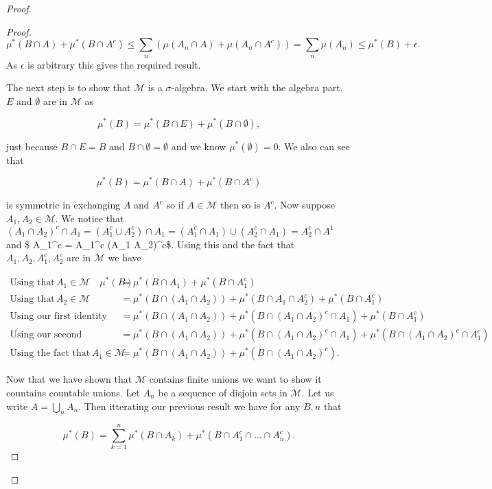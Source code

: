 \documentclass[
]{book}
\theoremstyle{definition}
\theoremstyle{definition}
\theoremstyle{definition}
\theoremstyle{definition}
\theoremstyle{remark}
\begin{document}
\begin{proof}
\begin{proof}
\[ \mu^*(B \cap A) + \mu^*(B \cap A^c) \leq \sum_n \left( \mu(A_n \cap A) + \mu(A_n \cap A^c) \right) = \sum_n \mu(A_n) \leq \mu^*(B) + \epsilon. \]
As \(\epsilon\) is arbitrary this gives the required result.

The next step is to show that \(\mathscr{M}\) is a \(\sigma\)-algebra. We start with the algebra part. \(E\) and \(\emptyset\) are in \(\mathscr{M}\) as

\[ \mu^*(B) = \mu^*(B \cap E) + \mu^*(B \cap \emptyset), \]

just because \(B \cap E = B\) and \(B \cap \emptyset = \emptyset\) and we know \(\mu^*(\emptyset) =0\). We also can see that

\[ \mu^*(B) = \mu^*(B \cap A) + \mu^*(B \cap A^c) \]

is symmetric in exchanging \(A\) and \(A^c\) so if \(A \in \mathscr{M}\) then so is \(A^c\). Now suppose \(A_1, A_2 \in \mathscr{M}\). We notice that \((A_1 \cap A_2)^c \cap A_1 = (A_1^c \cup A_2^c) \cap A_1 = (A_1^c \cap A_1) \cup (A_2^c \cap A_1) = A_2^c \cap A^1\) and \$ A\_1\^{}c = A\_1\^{}c \cap(A\_1 \cap A\_2)\^{}c\$. Using this and the fact that \(A_1, A_2, A_1^c, A_2^c\) are in \(\mathscr{M}\) we have

\begin{align*}\mbox{Using that} \, A_1 \in \mathscr{M} \quad \mu^*(B) &= \mu^*(B \cap A_1) + \mu^*(B \cap A_1^c)\\
\mbox{Using that}\, A_2 \in \mathscr{M} \quad &= \mu^*(B \cap (A_1 \cap A_2)) + \mu^*(B \cap A_1 \cap A_2^c) + \mu^*(B \cap A_1^c)\\
\mbox{Using our first identity} \quad &= \mu^*(B \cap (A_1 \cap A_2)) + \mu^*(B \cap (A_1 \cap A_2)^c \cap A_1) + \mu^*(B \cap A_1^c)\\
\mbox{Using our second identiy} \quad &= \mu^*(B \cap (A_1 \cap A_2)) + \mu^*(B \cap (A_1 \cap A_2)^c \cap A_1) + \mu^*(B \cap (A_1 \cap A_2)^c \cap A_1^c)\\
\mbox{Using the fact that}\, A_1 \in \mathscr{M} \quad &= \mu^*(B \cap (A_1 \cap A_2)) + \mu^*(B \cap (A_1 \cap A_2)^c).
\end{align*}

Now that we have shown that \(\mathscr{M}\) contains finite unions we want to show it countains countable unions. Let \(A_n\) be a sequence of disjoin sets in \(\mathscr{M}\). Let us write \(A = \bigcup_n A_n\). Then itterating our previous result we have for any \(B, n\) that

\[ \mu^*(B) = \sum_{k=1}^n \mu^*(B \cap A_k) + \mu^*( B \cap A_1^c \cap \dots \cap A_n^c). \]


\end{proof}
\end{proof}
\end{document}
